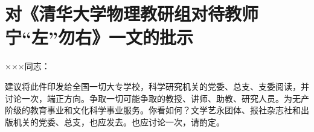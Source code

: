 \section[对《清华大学物理教研组对待教师宁“左”勿右》一文的批示（一九五八年十二月二十二日）]{对《清华大学物理教研组对待教师宁“左”勿右》一文的批示}


×××同志：

建议将此件印发给全国一切大专学校，科学研究机关的党委、总支、支委阅读，并讨论一次，端正方向。争取一切可能争取的教授、讲师、助教、研究人员。为无产阶级的教育事业和文化科学事业服务。你看如何？文学艺永团体、报社杂志社和出版机关的党委、总支，也应发去。也应讨论一次，请酌定。


